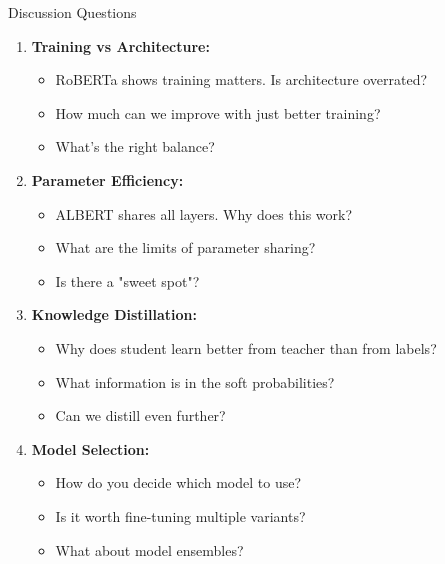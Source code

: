 \documentclass[aspectratio=169]{beamer}
\begin{document}
\begin{frame}[shrink=10]{Discussion Questions 💭}
\begin{enumerate}\setlength{\itemsep}{0pt}
    \item \textbf{Training vs Architecture:}
    \begin{itemize}\setlength{\itemsep}{0pt}
        \item RoBERTa shows training matters. Is architecture overrated?
        \item How much can we improve with just better training?
        \item What's the right balance?
    \end{itemize}

    \vspace{0.5em}

    \item \textbf{Parameter Efficiency:}
    \begin{itemize}\setlength{\itemsep}{0pt}
        \item ALBERT shares all layers. Why does this work?
        \item What are the limits of parameter sharing?
        \item Is there a "sweet spot"?
    \end{itemize}

    \vspace{0.5em}

    \item \textbf{Knowledge Distillation:}
    \begin{itemize}\setlength{\itemsep}{0pt}
        \item Why does student learn better from teacher than from labels?
        \item What information is in the soft probabilities?
        \item Can we distill even further?
    \end{itemize}

    \vspace{0.5em}

    \item \textbf{Model Selection:}
    \begin{itemize}\setlength{\itemsep}{0pt}
        \item How do you decide which model to use?
        \item Is it worth fine-tuning multiple variants?
        \item What about model ensembles?
    \end{itemize}
\end{enumerate}
\end{frame}
\end{document}
